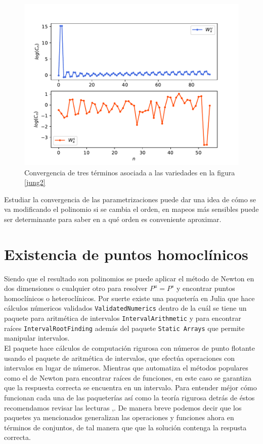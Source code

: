 \begin{figure}[H]
\centering
\includegraphics[scale=0.5]{convergenciaJungT57}
\caption{Convergencia de tres términos asociada a las variedades en la figura \ref{jung2}}
\label{convergenciaJ3}
\end{figure}

Estudiar la convergencia de las parametrizaciones puede dar una idea de cómo se va modificando el polinomio si se cambia el orden, en mapeos más sensibles puede ser determinante para saber en a qué orden es conveniente aproximar. 

\section{Existencia de puntos homoclínicos}

Siendo que el resultado son polinomios se puede aplicar el método de Newton en dos dimensiones o cualquier otro para resolver $P^{u}=P^{s}$ y encontrar puntos homoclínicos o heteroclínicos. Por suerte existe una paquetería en Julia que hace cálculos númericos validados \texttt{ValidatedNumerics}\cite{validated} dentro de la cuál se tiene un paquete para aritmética de intervalos \texttt{IntervalArithmetic}\citep{interval} y para encontrar raíces \texttt{IntervalRootFinding}\cite{root} además del paquete \texttt{Static Arrays}\cite{static} que permite manipular intervalos.\\ 

El paquete \cite{validated} hace cálculos de computación rigurosa con números de punto flotante usando el paquete de aritmética de intervalos, que efectúa operaciones con intervalos en lugar de números. Mientras que \cite{root} automatiza el métodos populares como el de Newton para encontrar raíces de funciones, en este caso se garantiza que la respuesta correcta se encuentra en un intervalo. Para entender méjor cómo funcionan cada una de las paqueterías así como la teoría rigurosa detrás de éstos recomendamos revisar las lecturas \cite{ramon},\cite{Numerics}. De manera breve podemos decir que los paquetes ya mencionados generalizan las operaciones y funciones ahora en términos de conjuntos, de tal manera que que la solución contenga la respusta correcta. \\


